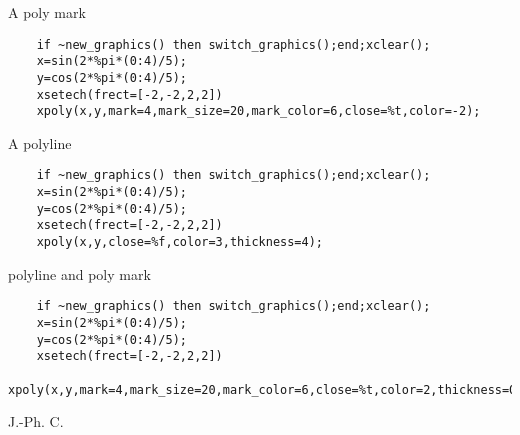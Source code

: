 \begin{examples}

\noindent A poly mark

  \begin{Verbatim}
    if ~new_graphics() then switch_graphics();end;xclear();
    x=sin(2*%pi*(0:4)/5);
    y=cos(2*%pi*(0:4)/5);
    xsetech(frect=[-2,-2,2,2])
    xpoly(x,y,mark=4,mark_size=20,mark_color=6,close=%t,color=-2);
  \end{Verbatim}

\noindent A polyline

  \begin{Verbatim}
    if ~new_graphics() then switch_graphics();end;xclear();
    x=sin(2*%pi*(0:4)/5);
    y=cos(2*%pi*(0:4)/5);
    xsetech(frect=[-2,-2,2,2])
    xpoly(x,y,close=%f,color=3,thickness=4);
  \end{Verbatim}

\noindent polyline and poly mark

  \begin{Verbatim}
    if ~new_graphics() then switch_graphics();end;xclear();
    x=sin(2*%pi*(0:4)/5);
    y=cos(2*%pi*(0:4)/5);
    xsetech(frect=[-2,-2,2,2])
    xpoly(x,y,mark=4,mark_size=20,mark_color=6,close=%t,color=2,thickness=0);
  \end{Verbatim}

\end{examples}
\begin{manseealso}
    
\end{manseealso}
\begin{authors}
  J.-Ph. C.
\end{authors}
